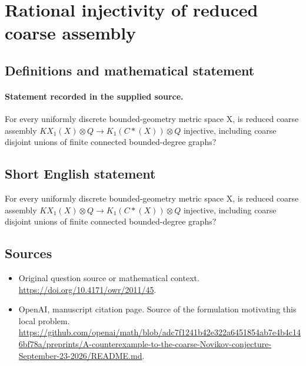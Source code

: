 \documentclass[11pt]{article}
\begin{document}
\section*{Rational injectivity of reduced coarse assembly}\label{30007507}
\subsection{Definitions and mathematical statement}
\paragraph{Statement recorded in the supplied source.}
For every uniformly discrete bounded-geometry metric space X, is reduced coarse assembly $KX_{1}(X)\otimes Q\to K_{1}(C*(X))\otimes Q$ injective, including coarse disjoint unions of finite connected bounded-degree graphs?
\subsection{Short English statement}
For every uniformly discrete bounded-geometry metric space X, is reduced coarse assembly $KX_{1}(X)\otimes Q\to K_{1}(C*(X))\otimes Q$ injective, including coarse disjoint unions of finite connected bounded-degree graphs?
\subsection{Sources}
\begin{itemize}
\item[S1] Original question source or mathematical context.
\url{https://doi.org/10.4171/owr/2011/45}.
\item[S2] OpenAI, manuscript citation page. Source of the formulation motivating this local problem.
\url{https://github.com/openai/math/blob/adc7f1241b42e322a6451854ab7e4b4c146bf78a/preprints/A-counterexample-to-the-coarse-Novikov-conjecture-September-23-2026/README.md}.
\end{itemize}
\end{document}
